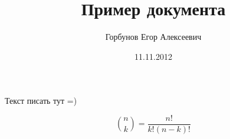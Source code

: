 


\title{Пример документа}
\author{Горбунов Егор Алексеевич}
\date{11.11.2012}


\maketitle

Текст писать тут =)

\begin{equation*}
\binom{n}{k}= \frac{n!}{k!(n-k)!}
\end{equation*}


